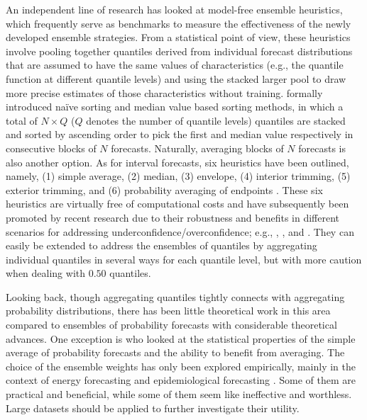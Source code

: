\documentclass[11pt]{article}
\begin{document}
An independent line of research has looked at model-free ensemble heuristics, which frequently serve as benchmarks to measure the effectiveness of the newly developed ensemble strategies. From a statistical point of view, these heuristics involve pooling together quantiles derived from individual forecast distributions that are assumed to have the same values of characteristics (e.g., the quantile function at different quantile levels) and using the stacked larger pool to draw more precise estimates of those characteristics without training. \cite{Wang2019-lx} formally introduced na\"{i}ve sorting and median value based sorting methods, in which a total of $N \times Q$ ($Q$ denotes the number of quantile levels) quantiles are stacked and sorted by ascending order to pick the first and median value respectively in consecutive blocks of $N$ forecasts. Naturally, averaging blocks of $N$ forecasts is also another option. As for interval forecasts, six heuristics have been outlined, namely, (1) simple average, (2) median, (3) envelope, (4) interior trimming, (5) exterior trimming, and (6) probability averaging of endpoints \citep{Park2015-zn,Gaba2017-om}. These six heuristics are virtually free of computational costs and have subsequently been promoted by recent research due to their robustness and benefits in different scenarios for addressing underconfidence/overconfidence; e.g., \cite{Smyl2019-av}, \cite{Petropoulos2020-fp}, and \cite{Grushka-Cockayne2020-qv}. They can easily be extended to address the ensembles of quantiles by aggregating individual quantiles in several ways for each quantile level, but with more caution when dealing with $0.50$ quantiles.


Looking back, though aggregating quantiles tightly connects with aggregating probability distributions, there has been little theoretical work in this area compared to ensembles of probability forecasts with considerable theoretical advances. One exception is \cite{Lichtendahl2013-rt} who looked at the statistical properties of the simple average of probability forecasts and the ability to benefit from averaging. The choice of the ensemble weights has only been explored empirically, mainly in the context of energy forecasting \citep[e.g.,][]{Wang2019-lx,Browell2020-pa} and epidemiological forecasting \citep[e.g.,][]{Brooks2020-sg,Ray2020-qg}. Some of them are practical and beneficial, while some of them seem like ineffective and worthless. Large datasets should be applied to further investigate their utility.
\end{document}
